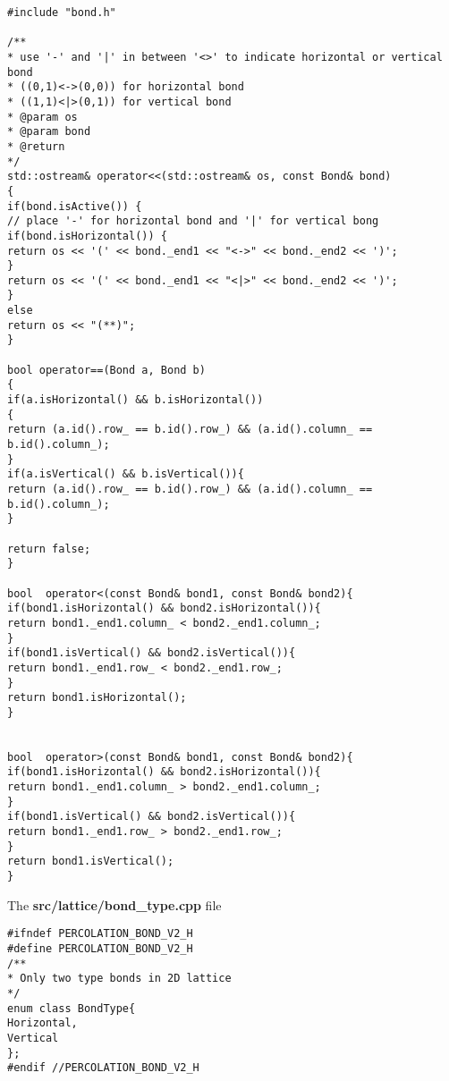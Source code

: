 \begin{lstlisting}[style=CStyle]
#include "bond.h"

/**
* use '-' and '|' in between '<>' to indicate horizontal or vertical bond
* ((0,1)<->(0,0)) for horizontal bond
* ((1,1)<|>(0,1)) for vertical bond
* @param os
* @param bond
* @return
*/
std::ostream& operator<<(std::ostream& os, const Bond& bond)
{
if(bond.isActive()) {
// place '-' for horizontal bond and '|' for vertical bong
if(bond.isHorizontal()) {
return os << '(' << bond._end1 << "<->" << bond._end2 << ')';
}
return os << '(' << bond._end1 << "<|>" << bond._end2 << ')';
}
else
return os << "(**)";
}

bool operator==(Bond a, Bond b)
{
if(a.isHorizontal() && b.isHorizontal())
{
return (a.id().row_ == b.id().row_) && (a.id().column_ == b.id().column_);
}
if(a.isVertical() && b.isVertical()){
return (a.id().row_ == b.id().row_) && (a.id().column_ == b.id().column_);
}

return false;
}

bool  operator<(const Bond& bond1, const Bond& bond2){
if(bond1.isHorizontal() && bond2.isHorizontal()){
return bond1._end1.column_ < bond2._end1.column_;
}
if(bond1.isVertical() && bond2.isVertical()){
return bond1._end1.row_ < bond2._end1.row_;
}
return bond1.isHorizontal();
}


bool  operator>(const Bond& bond1, const Bond& bond2){
if(bond1.isHorizontal() && bond2.isHorizontal()){
return bond1._end1.column_ > bond2._end1.column_;
}
if(bond1.isVertical() && bond2.isVertical()){
return bond1._end1.row_ > bond2._end1.row_;
}
return bond1.isVertical();
}
\end{lstlisting}


The \textbf{src/lattice/bond\_type.cpp} file

\begin{lstlisting}[style=CStyle]
#ifndef PERCOLATION_BOND_V2_H
#define PERCOLATION_BOND_V2_H
/**
* Only two type bonds in 2D lattice
*/
enum class BondType{
Horizontal,
Vertical
};
#endif //PERCOLATION_BOND_V2_H
\end{lstlisting}